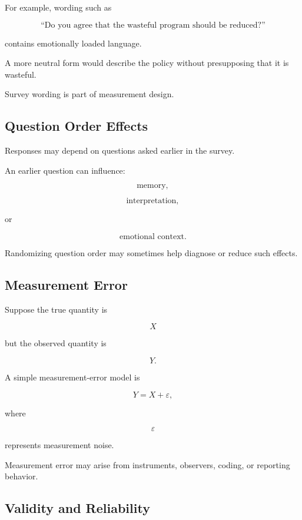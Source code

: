 For example, wording such as

\[
\text{``Do you agree that the wasteful program should be reduced?''}
\]

contains emotionally loaded language.

A more neutral form would describe the policy without presupposing that
it is wasteful.

Survey wording is part of measurement design.

\subsection{Question Order Effects}
\label{subsec:question-order-effects}

Responses may depend on questions asked earlier in the survey.

An earlier question can influence:

\[
\text{memory},
\]

\[
\text{interpretation},
\]

or

\[
\text{emotional context}.
\]

Randomizing question order may sometimes help diagnose or reduce such
effects.

\subsection{Measurement Error}
\label{subsec:measurement-error}

Suppose the true quantity is

\[
X
\]

but the observed quantity is

\[
Y.
\]

A simple measurement-error model is

\[
\boxed{
Y=X+\varepsilon,
}
\]

where

\[
\varepsilon
\]

represents measurement noise.

Measurement error may arise from instruments, observers, coding, or
reporting behavior.

\subsection{Validity and Reliability}
\label{subsec:validity-reliability}

